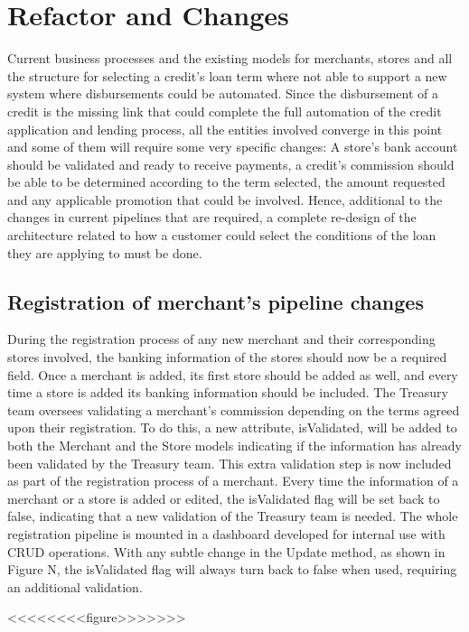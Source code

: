 \section{Refactor and Changes}
Current business processes and the existing models for merchants, stores and all the structure for selecting a credit’s loan term where not able to support a new system where disbursements could be automated. Since the disbursement of a credit is the missing link that could complete the full automation of the credit application and lending process, all the entities involved converge in this point and some of them will require some very specific changes: A store’s bank account should be validated and ready to receive payments, a credit’s commission should be able to be determined according to the term selected, the amount requested and any applicable promotion that could be involved. Hence, additional to the changes in current pipelines that are required, a complete re-design of the architecture related to how a customer could select the conditions of the loan they are applying to must be done.

\subsection{Registration of merchant’s pipeline changes}
During the registration process of any new merchant and their corresponding stores involved, the banking information of the stores should now be a required field. Once a merchant is added, its first store should be added as well, and every time a store is added its banking information should be included.
The Treasury team oversees validating a merchant’s commission depending on the terms agreed upon their registration. To do this, a new attribute, isValidated, will be added to both the Merchant and the Store models indicating if the information has already been validated by the Treasury team. This extra validation step is now included as part of the registration process of a merchant. Every time the information of a merchant or a store is added or edited, the isValidated flag will be set back to false, indicating that a new validation of the Treasury team is needed.
The whole registration pipeline is mounted in a dashboard developed for internal use with CRUD operations. With any subtle change in the Update method, as shown in Figure N, the isValidated flag will always turn back to false when used, requiring an additional validation.

<<<<<<<<figure>>>>>>>

